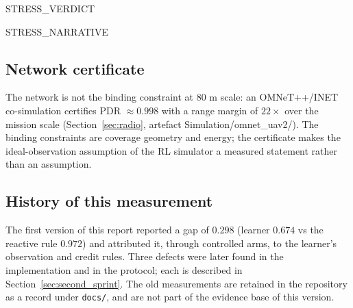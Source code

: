 {{STRESS_VERDICT}}

{{STRESS_NARRATIVE}}

\subsection{Network certificate}
\label{sec:results_network}

The network is not the binding constraint at 80 m scale: an OMNeT++/INET
co-simulation certifies PDR $\approx 0.998$ with a range margin of $22\times$
over the mission scale (Section~\ref{sec:radio}, artefact
Simulation/omnet_uav2/).  The binding constraints are coverage geometry and
energy; the certificate makes the ideal-observation assumption of the RL
simulator a measured statement rather than an assumption.

\subsection{History of this measurement}
\label{sec:history}

The first version of this report reported a gap of $0.298$ (learner $0.674$
vs the reactive rule $0.972$) and attributed it, through controlled arms, to
the learner's observation and credit rules.  Three defects were later found
in the implementation and in the protocol; each is described in
Section~\ref{sec:second_sprint}.  The old measurements are retained in the
repository as a record under \texttt{docs/}, and are not part of the evidence
base of this version.
